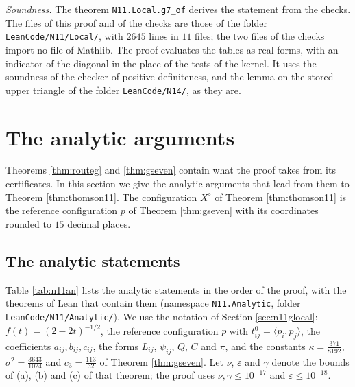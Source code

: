 \documentclass[reqno,a4paper,11pt]{amsart}
\numberwithin{equation}{section}
\newcommand{\lean}[1]{\texttt{#1}}
\newcommand{\file}[1]{\nolinkurl{#1}}
\newcommand{\factNrlLibFiles}{11}
\newcommand{\factNrlLibLines}{2645}
\begin{document}
\emph{Soundness.} The theorem \lean{N11.Local.g7\_of} derives the statement from the checks. The files of this proof and of the checks are those of the folder \file{LeanCode/N11/Local/}, with $\factNrlLibLines$ lines in $\factNrlLibFiles$ files; the two files of the checks import no file of Mathlib. The proof evaluates the tables as real forms, with an indicator of the diagonal in the place of the tests of the kernel. It uses the soundness of the checker of positive definiteness, and the lemma on the stored upper triangle of the folder \file{LeanCode/N14/}, as they are.

\section{The analytic arguments}\label{sec:n11full}

Theorems \ref{thm:routeg} and \ref{thm:gseven} contain what the proof takes from its certificates. In this section we give the analytic arguments that lead from them to Theorem \ref{thm:thomson11}. The configuration $X^{\circ}$ of Theorem \ref{thm:thomson11} is the reference configuration $p$ of Theorem \ref{thm:gseven} with its coordinates rounded to $15$ decimal places.

\subsection{The analytic statements}

Table \ref{tab:n11an} lists the analytic statements in the order of the proof, with the theorems of Lean that contain them (namespace \lean{N11.Analytic}, folder \file{LeanCode/N11/Analytic/}). We use the notation of Section \ref{sec:n11glocal}: $f(t) = (2-2t)^{-1/2}$, the reference configuration $p$ with $t^0_{ij} = \langle p_i, p_j \rangle$, the coefficients $a_{ij}, b_{ij}, c_{ij}$, the forms $L_{ij}$, $\psi_{ij}$, $Q$, $C$ and $\pi$, and the constants $\kappa = \tfrac{371}{8192}$, $\sigma^2 = \tfrac{3643}{1024}$ and $c_3 = \tfrac{113}{32}$ of Theorem \ref{thm:gseven}. Let $\nu$, $\varepsilon$ and $\gamma$ denote the bounds of (a), (b) and (c) of that theorem; the proof uses $\nu, \gamma \leq 10^{-17}$ and $\varepsilon \leq 10^{-18}$.
\end{document}
